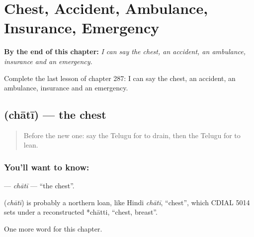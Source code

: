 
\chapter{Chest, Accident, Ambulance, Insurance, Emergency}
\label{ch:te-chest-accident-ambulance-insurance-emergency}

\begin{chapteropening}
\textbf{By the end of this chapter:} \emph{I can say the chest, an accident, an ambulance, insurance and an emergency.}

Complete the last lesson of chapter 287: I can say the chest, an accident, an ambulance, insurance and an emergency.
\end{chapteropening}

\section[\texorpdfstring{\te{ఛాతీ} (chātī)}{ఛాతీ (chātī)}]{ (chātī) — the chest}

\label{lesson:TE-C287-chati}



\begin{quote}
Before the new one: say the Telugu for to drain, then the Telugu for to lean.
\end{quote}

\subsection*{You'll want to know: }
\textbf{} — \emph{chātī} — \textquotedblleft{}the chest\textquotedblright{}.

\begin{cousinweb}
\textbf{} (\emph{chātī}) is probably a northern loan, like Hindi \emph{chātī}, \textquotedblleft{}chest\textquotedblright{}, which CDIAL 5014 sets under a reconstructed *chātti, \textquotedblleft{}chest, breast\textquotedblright{}.
\end{cousinweb}

\begin{grammarlens}[title={What you've built}]
One more word for this chapter.
\end{grammarlens}

